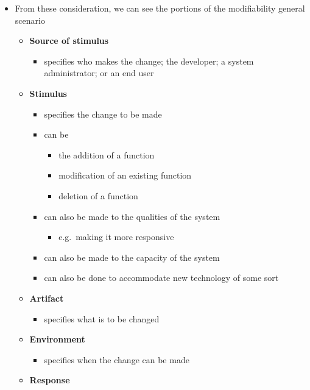 \documentclass[11pt]{article}
\providecommand{\tightlist}{%
      \setlength{\itemsep}{0pt}\setlength{\parskip}{0pt}}
\begin{document}
\begin{itemize}
\item
  From these consideration, we can see the portions of the modifiability
  general scenario

  \begin{itemize}
  \tightlist
  \item
    \textbf{Source of stimulus}

    \begin{itemize}
    \tightlist
    \item
      specifies who makes the change; the developer; a system
      administrator; or an end user
    \end{itemize}
  \item
    \textbf{Stimulus}

    \begin{itemize}
    \tightlist
    \item
      specifies the change to be made
    \item
      can be

      \begin{itemize}
      \tightlist
      \item
        the addition of a function
      \item
        modification of an existing function
      \item
        deletion of a function
      \end{itemize}
    \item
      can also be made to the qualities of the system

      \begin{itemize}
      \tightlist
      \item
        e.g.~making it more responsive
      \end{itemize}
    \item
      can also be made to the capacity of the system
    \item
      can also be done to accommodate new technology of some sort
    \end{itemize}
  \item
    \textbf{Artifact}

    \begin{itemize}
    \tightlist
    \item
      specifies what is to be changed
    \end{itemize}
  \item
    \textbf{Environment}

    \begin{itemize}
    \tightlist
    \item
      specifies when the change can be made
    \end{itemize}
  \item
    \textbf{Response}


\end{itemize}
\end{itemize}
\end{document}
